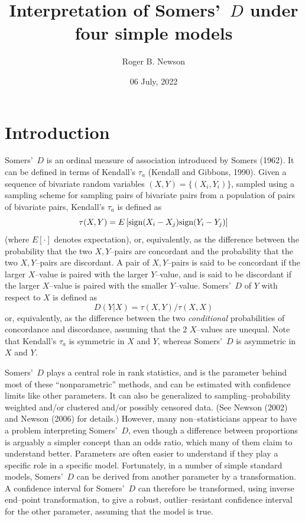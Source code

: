 \documentclass[a4paper,notitlepage]{article}      %
\title{Interpretation of Somers'~$D$ under four simple models}  %
\author{Roger B. Newson}      %
\date{06 July, 2022}      %
\begin{document}

\maketitle                   %

\section{Introduction}

Somers'~$D$ is an ordinal measure of association introduced by Somers (1962)\cite{somers1962}.
It can be defined in terms of Kendall's $\tau_a$ (Kendall and Gibbons, 1990)\cite{kendall1990}.
Given a sequence of bivariate random variables $(X,Y)=\{(X_i,Y_i)\}$,
sampled using a sampling scheme for sampling pairs of bivariate pairs
from a population of pairs of bivariate pairs,
Kendall's $\tau_a$ is defined as
\def\sign{{\rm sign}}
\begin{equation}
\tau(X,Y)=E\left[\sign(X_i-X_j)\sign(Y_i-Y_j)\right]
\label{eq:eqseq15}
\end{equation}
(where $E[\cdot]$ denotes expectation), or, equivalently,
as the difference between the probability that the two $X,Y$--pairs are concordant
and the probability that the two $X,Y$--pairs are discordant.
A pair of $X,Y$--pairs is said to be concordant if the larger $X$--value is paired with the larger $Y$--value,
and is said to be discordant if the larger $X$--value is paired with the smaller $Y$--value.
Somers'~$D$ of $Y$ with respect to $X$ is defined as
\begin{equation}
D(Y|X)=\tau(X,Y)/\tau(X,X)
\label{eq:eqseq16}
\end{equation}
or, equivalently, as the difference between the two \textit{conditional} probabilities of concordance and discordance,
assuming that the 2 $X$--values are unequal.
Note that Kendall's $\tau_a$ is symmetric in $X$ and $Y$,
whereas Somers'~$D$ is asymmetric in $X$ and $Y$.

Somers'~$D$ plays a central role in rank statistics,
and is the parameter behind most of these ``nonparametric'' methods,
and can be estimated with confidence limits like other parameters.
It can also be generalized to sampling--probability weighted and/or clustered and/or possibly censored data.
(See Newson (2002)\cite{newson2002} and Newson (2006)\cite{newson2006} for details.)
However, many non--statisticians appear to have a problem interpreting Somers'~$D$,
even though a difference between proportions is arguably a simpler concept than an odds ratio,
which many of them claim to understand better.
Parameters are often easier to understand if they play a specific role in a specific model.
Fortunately, in a number of simple standard models,
Somers'~$D$ can be derived from another parameter by a transformation.
A confidence interval for Somers'~$D$ can therefore be transformed, using inverse end--point transformation,
to give a robust, outlier--resistant confidence interval for the other parameter,
assuming that the model is true.
\end{document}
